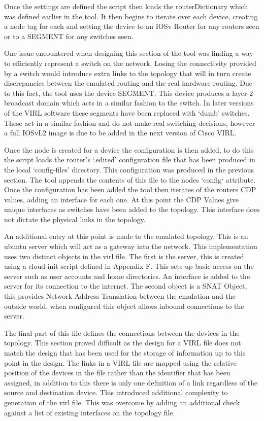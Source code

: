 \documentclass[11pt]{report}
\begin{document}
Once the settings are defined the script then loads the routerDictionary which was defined earlier in the tool. It then begins to iterate over each device, creating a node tag for each and setting the device to an IOSv Router for any routers seen or to a SEGMENT for any switches seen.

One issue encountered when designing this section of the tool was finding a way to efficiently represent a switch on the network. Losing the connectivity provided by a switch would introduce extra links to the topology that will in turn create discrepancies between the emulated routing and the real hardware routing. Due to this fact, the tool uses the device SEGMENT. This device produces a layer-2 broadcast domain which acts in a similar fashion to the switch. In later versions of the VIRL software these segments have been replaced with `dumb' switches. These act in a similar fashion and do not make real switching decisions, however a full IOSvL2 image is due to be added in the next version of Cisco VIRL.

Once the node is created for a device the configuration is then added, to do this the script loads the router's `.edited' configuration file that has been produced in the local `config-files' directory. This configuration was produced in the previous section. The tool appends the contents of this file to the nodes `config` attribute. Once the configuration has been added the tool then iterates of the routers CDP values, adding an interface for each one. At this point the CDP Values give unique interfaces as switches have been added to the topology. This interface does not dictate the physical links in the topology.

An additional entry at this point is made to the emulated topology. This is an ubuntu server which will act as a gateway into the network. This implementation uses two distinct objects in the virl file. The first is the server, this is created using a cloud-init script defined in Appendix F. This sets up basic access on the server such as user accounts and home directories. An interface is added to the server for its connection to the internet. The second object is a SNAT Object, this provides Network Address Translation between the emulation and the outside world, when configured this object allows inbound connections to the server.

The final part of this file defines the connections between the devices in the topology. This section proved difficult as the design for a VIRL file does not match the design that has been used for the storage of information up to this point in the design. The links in a VIRL file are mapped using the relative position of the devices in the file rather than the identifier that has been assigned, in addition to this there is only one definition of a link regardless of the source and destination device. This introduced additional complexity to generation of the virl file. This was overcome by adding an additional check against a list of existing interfaces on the topology file.
\end{document}

